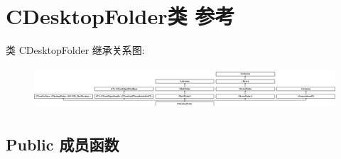 \hypertarget{class_c_desktop_folder}{}\section{C\+Desktop\+Folder类 参考}
\label{class_c_desktop_folder}
类 C\+Desktop\+Folder 继承关系图\+:\begin{figure}[H]
\begin{center}
\leavevmode
\includegraphics[height=1.590909cm]{class_c_desktop_folder}
\end{center}
\end{figure}
\subsection*{Public 成员函数}
